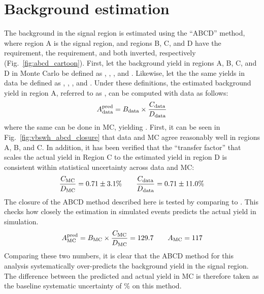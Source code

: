 \section{Background estimation}
The background in the signal region is estimated using the ``ABCD'' method, where region A is the signal region, and regions B, C, and D have the \detajj requirement, the \MSD requirement, and both inverted, respectively (Fig.~\ref{fig:abcd_cartoon}). 
First, let the background yield in regions A, B, C, and D in Monte Carlo be defined as \AMC, \BMC, \CMC, and \DMC.
Likewise, let the the same yields in data be defined as  \Adata, \Bdata, \Cdata, and \Ddata.
Under these definitions, the estimated background yield in region A, referred to as \AdataPred, can be computed with data as follows:
\begin{equation}\label{eq:vbswh_abcd}
    A_{\text{data}}^{\text{pred}} = B_{\text{data}}\times\frac{C_{\text{data}}}{D_{\text{data}}}
\end{equation}
\noindent where the same can be done in MC, yielding \AMCPred. 
First, it can be seen in Fig.~\ref{fig:vbswh_abcd_closure} that data and MC agree reasonably well in regions A, B, and C. 
In addition, it has been verified that the ``transfer factor'' that scales the actual yield in Region C to the estimated yield in region D is consistent within statistical uncertainty across data and MC:
\begin{equation*}
    \frac{C_{\mathrm{MC}}}{D_{\mathrm{MC}}} = 0.71 \pm 3.1\% \qquad \frac{C_{\text{data}}}{D_{\text{data}}} = 0.71 \pm 11.0\%
\end{equation*}
The closure of the ABCD method described here is tested by comparing \AMCPred to \AMC. 
This checks how closely the estimation in simulated events predicts the actual yield in simulation. 
\begin{equation*}
    A_{\mathrm{MC}}^{\text{pred}} = B_{\mathrm{MC}}\times\frac{C_{\mathrm{MC}}}{D_{\mathrm{MC}}} = 129.7 \qquad A_{\mathrm{MC}} = 117
\end{equation*}
Comparing these two numbers, it is clear that the ABCD method for this analysis systematically over-predicts the background yield in the signal region. 
The difference between the predicted and actual yield in MC is therefore taken as the baseline systematic uncertainty of \BkgEstMethodSystErr\% on this method. 
